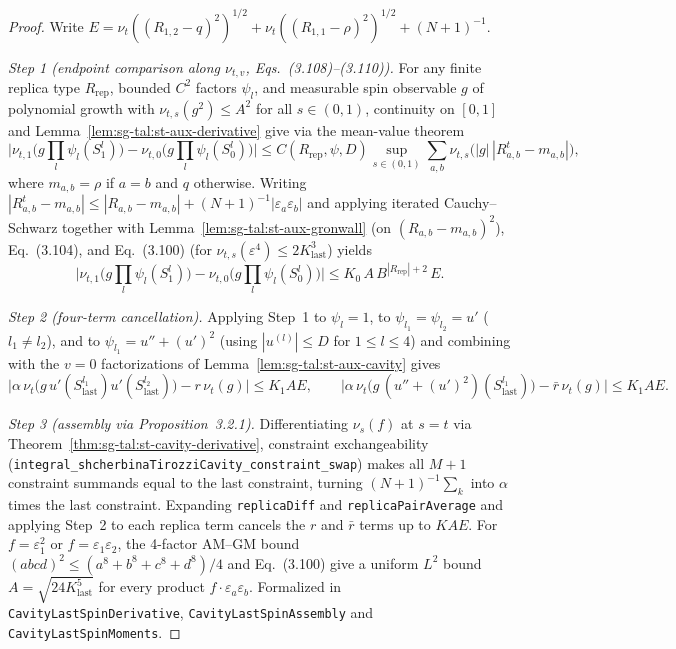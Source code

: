 \begin{proof}
  \leanok
Write $E=\nu_t((R_{1,2}-q)^2)^{1/2}+\nu_t((R_{1,1}-\rho)^2)^{1/2}+(N+1)^{-1}$.

\emph{Step 1 (endpoint comparison along $\nu_{t,v}$, Eqs.~(3.108)--(3.110)).} For any finite replica type
$R_{\mathrm{rep}}$, bounded $C^2$ factors $\psi_l$, and measurable spin observable $g$ of polynomial growth
with $\nu_{t,s}(g^2)\le A^2$ for all $s\in(0,1)$, continuity on $[0,1]$ and Lemma~\ref{lem:sg-tal:st-aux-derivative}
give via the mean-value theorem
\[
\bigl|\nu_{t,1}\bigl(g\prod_l\psi_l(S_1^l)\bigr)-\nu_{t,0}\bigl(g\prod_l\psi_l(S_0^l)\bigr)\bigr|
  \le C(R_{\mathrm{rep}},\psi,D)\sup_{s\in(0,1)}\sum_{a,b}\nu_{t,s}\bigl(|g|\,|R^t_{a,b}-m_{a,b}|\bigr),
\]
where $m_{a,b}=\rho$ if $a=b$ and $q$ otherwise. Writing $|R^t_{a,b}-m_{a,b}|\le |R_{a,b}-m_{a,b}|
+(N+1)^{-1}|\varepsilon_a\varepsilon_b|$ and applying iterated Cauchy--Schwarz together with
Lemma~\ref{lem:sg-tal:st-aux-gronwall} (on $(R_{a,b}-m_{a,b})^2$), Eq.~(3.104), and Eq.~(3.100) (for
$\nu_{t,s}(\varepsilon^4)\le 2K_{\mathrm{last}}^3$) yields
\[
\bigl|\nu_{t,1}\bigl(g\prod_l\psi_l(S_1^l)\bigr)-\nu_{t,0}\bigl(g\prod_l\psi_l(S_0^l)\bigr)\bigr|
  \le K_0\,A\,B^{|R_{\mathrm{rep}}|+2}\,E.
\]

\emph{Step 2 (four-term cancellation).} Applying Step~1 to $\psi_l=1$, to $\psi_{l_1}=\psi_{l_2}=u'$
($l_1\ne l_2$), and to $\psi_{l_1}=u''+(u')^2$ (using $|u^{(l)}|\le D$ for $1\le l\le 4$) and combining with
the $v=0$ factorizations of Lemma~\ref{lem:sg-tal:st-aux-cavity} gives
\[
\bigl|\alpha\,\nu_t\bigl(g\,u'(S_{\mathrm{last}}^{l_1})u'(S_{\mathrm{last}}^{l_2})\bigr)-r\,\nu_t(g)\bigr|\le K_1 A E,
\qquad
\bigl|\alpha\,\nu_t\bigl(g\,(u''+(u')^2)(S_{\mathrm{last}}^{l_1})\bigr)-\bar r\,\nu_t(g)\bigr|\le K_1 A E.
\]

\emph{Step 3 (assembly via Proposition~3.2.1).} Differentiating $\nu_s(f)$ at $s=t$ via
Theorem~\ref{thm:sg-tal:st-cavity-derivative}, constraint exchangeability
(\texttt{integral\_shcherbinaTirozziCavity\_constraint\_swap}) makes all $M+1$ constraint summands equal to
the last constraint, turning $(N+1)^{-1}\sum_k$ into $\alpha$ times the last constraint. Expanding
\texttt{replicaDiff} and \texttt{replicaPairAverage} and applying Step~2 to each replica term cancels the
$r$ and $\bar r$ terms up to $K A E$. For $f=\varepsilon_1^2$ or $f=\varepsilon_1\varepsilon_2$, the 4-factor
AM--GM bound $(abcd)^2\le(a^8+b^8+c^8+d^8)/4$ and Eq.~(3.100) give a uniform $L^2$ bound $A=\sqrt{24K_{\mathrm{last}}^5}$
for every product $f\cdot\varepsilon_a\varepsilon_b$.
Formalized in \texttt{CavityLastSpinDerivative}, \texttt{CavityLastSpinAssembly} and
\texttt{CavityLastSpinMoments}.
\end{proof}

